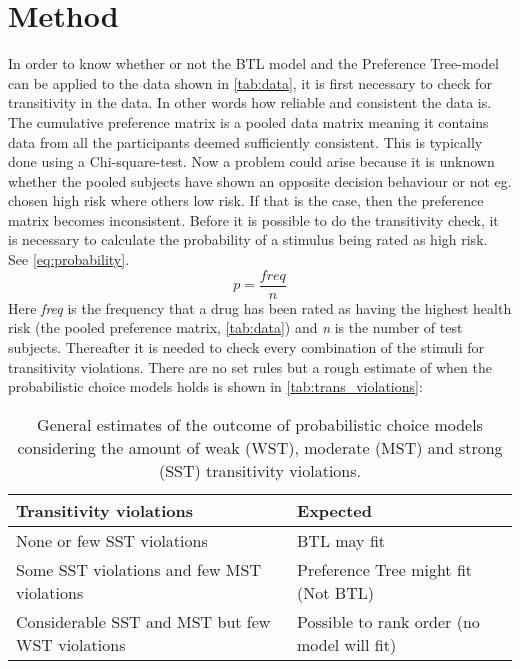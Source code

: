 \section*{Method}
\label{Method}
%
In order to know whether or not the BTL model and the Preference Tree-model can be applied to the data shown in \autoref{tab:data}, it is first necessary to check for transitivity in the data. In other words how reliable and consistent the data is. The cumulative preference matrix is a pooled data matrix meaning it contains data from all the participants deemed sufficiently consistent. This is typically done using a Chi-square-test. Now a problem could arise because it is unknown whether the pooled subjects have shown an opposite decision behaviour or not eg. chosen high risk where others low risk. If that is the case, then the preference matrix becomes inconsistent. Before it is possible to do the transitivity check, it is necessary to calculate the probability of a stimulus being rated as high risk. See \autoref{eq:probability}.
%
\begin{equation}
p = \frac{freq}{n}
\label{eq:probability}
\end{equation}
\noindent
%
Here \textit{freq} is the frequency that a drug has been rated as having the highest health risk (the pooled preference matrix, \autoref{tab:data}) and \textit{n} is the number of test subjects. Thereafter it is needed to check every combination of the stimuli for transitivity violations. There are no set rules but a rough estimate of when the probabilistic choice models holds is shown in \autoref{tab:trans_violations}:
%
\begin{table}[H]
\centering
\begin{tabular}{@{}ll@{}}
\toprule
Transitivity violations                                    & Expected                                      \\ \midrule
None or few SST violations                                 & BTL may fit                                   \\
Some SST violations and few MST violations                 & Preference Tree might fit (Not BTL)            \\
Considerable SST and MST but few WST violations & Possible to rank order (no model will fit) \\ \bottomrule
\end{tabular}
\caption{General estimates of the outcome of probabilistic choice models considering the amount of weak (WST), moderate (MST) and strong (SST) transitivity violations.}
\label{tab:trans_violations}
\end{table}
